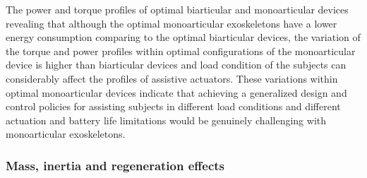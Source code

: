 \documentclass[10pt,letterpaper]{article}
\begin{document}
The power and torque profiles of optimal biarticular and monoarticular devices revealing that although the optimal monoarticular exoskeletons have a lower energy consumption comparing to the optimal biarticular devices, the variation of the torque and power profiles within optimal configurations of the monoarticular device is higher than biarticular devices and load condition of the subjects can considerably affect the profiles of assistive actuators. These variations within optimal monoarticular devices indicate that achieving a generalized design and control policies for assisting subjects in different load conditions and different actuation and battery life limitations would be genuinely challenging with monoarticular exoskeletons.\\

\subsubsection*{Mass, inertia and regeneration effects}
\end{document}
